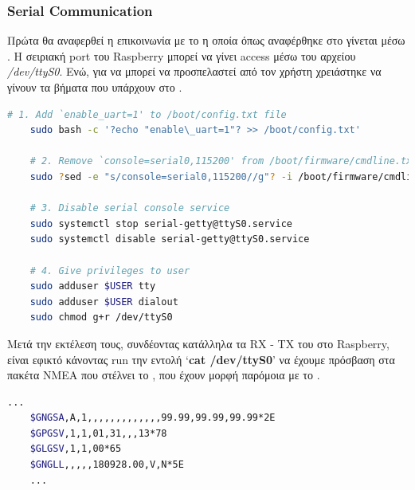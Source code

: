 \subsubsection{Serial Communication}
Πρώτα θα αναφερθεί η επικοινωνία με το  η οποία όπως αναφέρθηκε στο  γίνεται μέσω . Η σειριακή port του Raspberry μπορεί να γίνει access μέσω του αρχείου \textit{/dev/ttyS0}. Ενώ, για να μπορεί να προσπελαστεί από τον χρήστη χρειάστηκε να γίνουν τα βήματα \cite{serial-fix} που υπάρχουν στο .


\begin{lstlisting}[language=bash, escapechar=?, caption={Fix serial communication},label=list:fix-serial-communication]
    # 1. Add `enable_uart=1' to /boot/config.txt file
    sudo bash -c '?echo "enable\_uart=1"? >> /boot/config.txt'

    # 2. Remove `console=serial0,115200' from /boot/firmware/cmdline.txt
    sudo ?sed -e "s/console=serial0,115200//g"? -i /boot/firmware/cmdline.txt

    # 3. Disable serial console service
    sudo systemctl stop serial-getty@ttyS0.service
    sudo systemctl disable serial-getty@ttyS0.service

    # 4. Give privileges to user
    sudo adduser $USER tty
    sudo adduser $USER dialout
    sudo chmod g+r /dev/ttyS0
\end{lstlisting}

Μετά την εκτέλεση τους, συνδέοντας κατάλληλα τα RX - TX του  στο Ra\-spbe\-rry, είναι εφικτό κάνοντας run την εντολή `\textbf{cat /dev/ttyS0}' να έχουμε πρόσβαση στα πακέτα NMEA που στέλνει το , που έχουν μορφή παρόμοια με το .

\begin{lstlisting}[language=bash, escapechar=@, caption={Serial Output, NMEA packets example},label=list:serial-output]
    ...
    $GNGSA,A,1,,,,,,,,,,,,,99.99,99.99,99.99*2E
    $GPGSV,1,1,01,31,,,13*78
    $GLGSV,1,1,00*65
    $GNGLL,,,,,180928.00,V,N*5E
    ...
\end{lstlisting}

